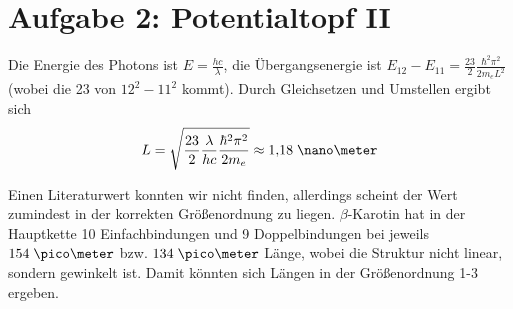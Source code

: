\documentclass[a4paper,german,12pt,smallheadings]{scrartcl}
\begin{document}
\section*{Aufgabe 2: Potentialtopf II}

Die Energie des Photons ist $E = \frac{hc}{\lambda}$, die Übergangsenergie ist
$E_{12} - E_{11} = \frac{23}{2} \frac{\hbar^2 \pi^2}{2 m_e L^2}$ (wobei die 23
von $12^2 - 11^2$ kommt). Durch Gleichsetzen und Umstellen ergibt sich
\begin{align}
  L = \sqrt{\frac{23}{2} \frac{\lambda}{hc} \frac{\hbar^2 \pi^2}{2 m_e}} \approx 1{,}18 \; \nano\meter
\end{align}

Einen Literaturwert konnten wir nicht finden, allerdings scheint der Wert
zumindest in der korrekten Größenordnung zu liegen. $\beta$-Karotin hat in der
Hauptkette 10 Einfachbindungen und 9 Doppelbindungen bei jeweils $154 \;
\pico\meter$ bzw. $134 \; \pico\meter$ Länge, wobei die Struktur nicht linear,
sondern gewinkelt ist. Damit könnten sich Längen in der Größenordnung 1-3
\nano\meter \;ergeben.
\end{document}
